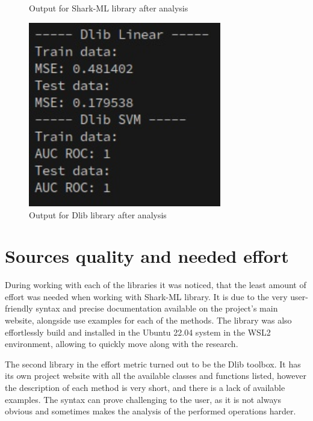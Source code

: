 \begin{figure}[!ht]
\begin{minipage}{0.31\textwidth}
		\caption{Output for Shark-ML library after analysis}
		\label{fig:shark_linear_svm2}		
	\end{minipage}%
	\hspace{0.02\textwidth}
	\begin{minipage}{0.31\textwidth}
		\centering
		\includegraphics[width=0.75\textwidth]{Rysunki/Rozdzial7/dlib_linear_svm}
		\caption{Output for Dlib library after analysis}
		\label{fig:dlib_linear_svm2}
	\end{minipage}
\end{figure} 

\section{Sources quality and needed effort}

During working with each of the libraries it was noticed, that the least amount of effort was needed when working with Shark-ML library. It is due to the very user-friendly syntax and precise documentation available on the project's main website, alongside use examples for each of the methods. The library was also effortlessly build and installed in the Ubuntu 22.04 system in the WSL2 environment, allowing to quickly move along with the research.

The second library in the effort metric turned out to be the Dlib toolbox. It has its own project website with all the available classes and functions listed, however the description of each method is very short, and there is a lack of available examples. The syntax can prove challenging to the user, as it is not always obvious and sometimes makes the analysis of the performed operations harder.

